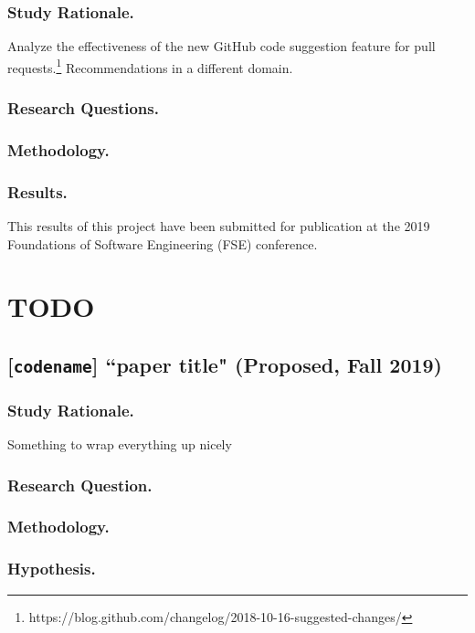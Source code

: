 \documentclass[runningheads]{llncs}
\begin{document}
\subsubsection{Study Rationale.} Analyze the effectiveness of the new GitHub code suggestion feature for pull requests.\footnote{https://blog.github.com/changelog/2018-10-16-suggested-changes/} Recommendations in a different domain.

\subsubsection{Research Questions.}

\subsubsection{Methodology.}

\subsubsection{Results.} This results of this project have been submitted for publication at the 2019 Foundations of Software Engineering (FSE) conference.

\section{TODO} 


\subsection{[\texttt{codename}] ``paper title" (Proposed, Fall 2019)}

\subsubsection{Study Rationale.} Something to wrap everything up nicely

\subsubsection{Research Question.}

\subsubsection{Methodology.} 

\subsubsection{Hypothesis.} 
\end{document}
